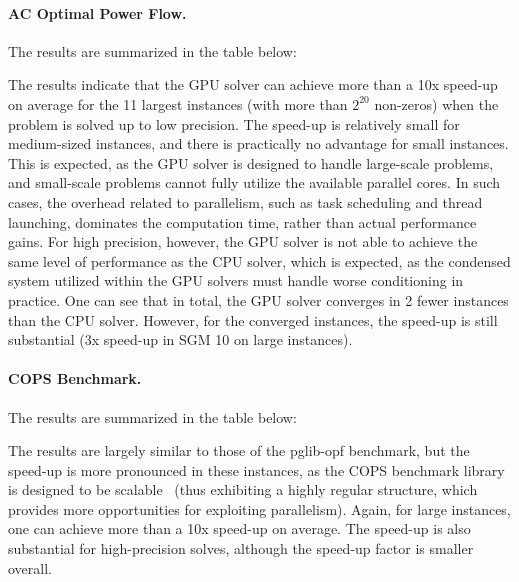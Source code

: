\documentclass{article}
\begin{document}
\paragraph{AC Optimal Power Flow.}
The results are summarized in the table below:
\begin{center}
  \footnotesize
  
\end{center}
The results indicate that the GPU solver can achieve more than a 10x speed-up on average for the 11 largest instances (with more than $2^{20}$ non-zeros) when the problem is solved up to low precision. The speed-up is relatively small for medium-sized instances, and there is practically no advantage for small instances. This is expected, as the GPU solver is designed to handle large-scale problems, and small-scale problems cannot fully utilize the available parallel cores. In such cases, the overhead related to parallelism, such as task scheduling and thread launching, dominates the computation time, rather than actual performance gains. For high precision, however, the GPU solver is not able to achieve the same level of performance as the CPU solver, which is expected, as the condensed system utilized within the GPU solvers must handle worse conditioning in practice. One can see that in total, the GPU solver converges in 2 fewer instances than the CPU solver. However, for the converged instances, the speed-up is still substantial (3x speed-up in SGM 10 on large instances).



\paragraph{COPS Benchmark.}
The results are summarized in the table below:
\begin{center}
  \footnotesize
  
\end{center}
The results are largely similar to those of the pglib-opf benchmark, but the speed-up is more pronounced in these instances, as the COPS benchmark library is designed to be scalable~\cite{dolanBenchmarkingOptimizationSoftware2001} (thus exhibiting a highly regular structure, which provides more opportunities for exploiting parallelism). Again, for large instances, one can achieve more than a 10x speed-up on average. The speed-up is also substantial for high-precision solves, although the speed-up factor is smaller overall.
\end{document}
